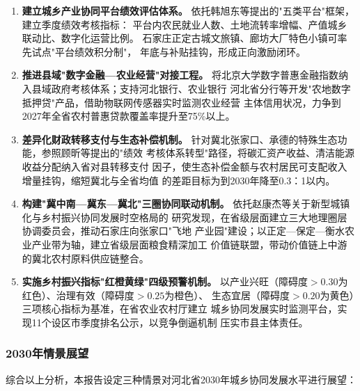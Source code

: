 \documentclass[12pt, a4paper, twoside]{ctexart}
\begin{document}
\begin{enumerate}[label=\textbf{（\arabic*）}, leftmargin=4.5em, itemsep=6pt]

  \item \textbf{建立城乡产业协同平台绩效评估体系。}
        依托韩旭东等\cite{han2025}提出的"五类平台"框架，建立季度绩效考核指标：
        平台内农民就业人数、土地流转率增幅、产值城乡联动比、数字化运营比例。
        石家庄正定古城文旅镇、廊坊大厂特色小镇可率先试点"平台绩效积分制"，
        年底与补贴挂钩，形成正向激励闭环。

  \item \textbf{推进县域"数字金融—农业经营"对接工程。}
        将北京大学数字普惠金融指数纳入县域政府考核体系；支持河北银行、农业银行
        河北省分行等开发"农地数字抵押贷"产品，借助物联网传感器实时监测农业经营
        主体信用状况，力争到2027年全省农村普惠贷款覆盖率提升至75\%以上。

  \item \textbf{差异化财政转移支付与生态补偿机制。}
        针对冀北张家口、承德的特殊生态功能，参照顾昕等\cite{gu2024}提出的"绩效
        考核体系转型"路径，将碳汇资产收益、清洁能源收益分配纳入省对县转移支付
        因子，使生态补偿金额与农村居民可支配收入增量挂钩，缩短冀北与全省均值
        的差距目标为到2030年降至0.3：1以内。

  \item \textbf{构建"冀中南—冀东—冀北"三圈协同联动机制。}
        依托赵康杰等\cite{zhao2026}关于新型城镇化与乡村振兴协同发展时空格局的
        研究发现，在省级层面建立三大地理圈层协调委员会，推动石家庄向张家口"飞地
        产业园"建设；以正定—保定—衡水农业产业带为轴，建立省级层面粮食精深加工
        价值链联盟，带动价值链上中游的冀北农村原料供应链整合。

  \item \textbf{实施乡村振兴指标"红橙黄绿"四级预警机制。}
        以产业兴旺（障碍度$>0.30$为红色）、治理有效（障碍度$>0.25$为橙色）、
        生态宜居（障碍度$>0.20$为黄色）三项核心指标为基准，在省农业农村厅建立
        城乡协同发展实时监测平台，实现11个设区市季度排名公示，以竞争倒逼机制
        压实市县主体责任。

\end{enumerate}

\subsubsection{2030年情景展望}

综合以上分析，本报告设定三种情景对河北省2030年城乡协同发展水平进行展望：
\end{document}
